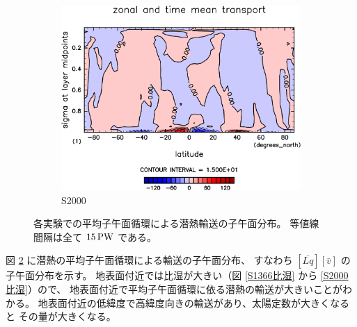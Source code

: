 \documentclass[body]{subfiles}
\begin{document}
\begin{figure}[t]
\begin{subfigure}{.4\textwidth}
		\includegraphics[width=\columnwidth]{S2000/MeriHeatTransTest@latentEn_M,time=7300:7665-crop-rotate.pdf}
		\caption{S2000}\label{潜熱平均子午面循環S2000}
	\end{subfigure}
	\caption[各実験での平均子午面循環による潜熱輸送の子午面分布]{
		各実験での平均子午面循環による潜熱輸送の子午面分布。
		等値線間隔は全て \(15\hmu{PW}\) である。
	}\label{潜熱平均子午面循環}
\end{figure}

図 \ref{潜熱平均子午面循環} に潜熱の平均子午面循環による輸送の子午面分布、
すなわち \([\overline{Lq}][\bar v]\) の子午面分布を示す。
地表面付近では比湿が大きい（図 \ref{S1366比湿} から \ref{S2000比湿}）ので、
地表面付近で平均子午面循環に依る潜熱の輸送が大きいことがわかる。
地表面付近の低緯度で高緯度向きの輸送があり、太陽定数が大きくなると
その量が大きくなる。
\end{document}
